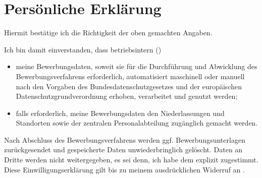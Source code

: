 \documentclass[
	a4paper,
	fontsize=12
]{scrartcl}
\begin{document}
\newcommand{\RemainingPageHeight}{\dimexpr\pagegoal-\pagetotal-\baselineskip\relax}

\newcommand{\PageFillImage}[1]{%
	\begin{minipage}[b]{\textwidth}
		\center\fcolorbox{RoyalBlue}{white}{
			\texttt{[image: \\CVDataPath/\#1]}
		}
	\end{minipage}
	\newpage
}%

\CVDocs

\section{Persönliche Erklärung}

Hiermit bestätige ich die Richtigkeit der oben gemachten Angaben.

Ich bin damit einverstanden, dass betriebsintern (\RecpCompany)
\begin{itemize}\itemsep0em
\item meine Bewerbungsdaten, soweit sie für die Durchführung und Abwicklung des Bewerbungsverfahrens erforderlich, automatisiert maschinell oder manuell nach den Vorgaben des Bundesdatenschutzgesetzes und der europäischen Datenschutzgrundverordnung erhoben, verarbeitet und genutzt werden;
\item falls erforderlich, meine Bewerbungsdaten den Niederlassungen und Standorten sowie der zentralen Personalabteilung zugänglich gemacht werden.
\end{itemize}
Nach Abschluss des Bewerbungsverfahrens werden ggf. Bewerbungsunterlagen zurückgesendet und gespeicherte Daten unwiederbringlich gelöscht. Daten an Dritte werden nicht weitergegeben, es sei denn, ich habe dem explizit zugestimmt. Diese Einwilligungserklärung gilt bis zu meinem ausdrücklichen Widerruf an \RecpEmail.

\vfill
\MySignature
\vfill\vfill\vfill
\end{document}
